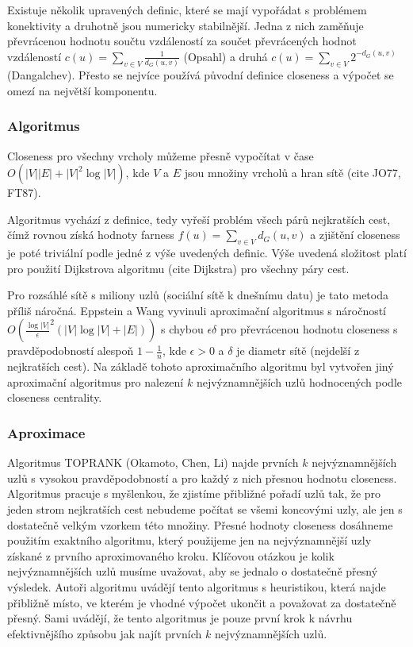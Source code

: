 \documentclass[12pt,titlepage]{report}
\begin{document}
Existuje několik upravených definic, které se mají vypořádat s problémem
konektivity a druhotně jsou numericky stabilnější. Jedna z nich zaměňuje
převrácenou hodnotu součtu vzdáleností za součet převrácených hodnot
vzdáleností $c(u) = \sum_{v \in V} \frac{1}{d_G(u, v)}$ (Opsahl) a druhá $c(u)
= \sum_{v \in V} 2^{-d_G(u, v)}$ (Dangalchev). Přesto se nejvíce používá
původní definice closeness a výpočet se omezí na největší komponentu.



\subsubsection{Algoritmus}
Closeness pro všechny vrcholy můžeme přesně vypočítat v čase $O(|V||E| +
|V|^2\log|V|)$, kde $V$ a $E$ jsou množiny vrcholů a hran sítě (cite JO77,
FT87). 

Algoritmus vychází z definice, tedy vyřeší problém všech párů nejkratších cest,
čímž rovnou získá hodnoty farness $f(u) = \sum_{v \in V} d_G(u, v)$ a zjištění
closeness je poté triviální podle jedné z výše uvedených definic.  Výše uvedená
složitost platí pro použití Dijkstrova algoritmu (cite Dijkstra) pro všechny
páry cest.

Pro rozsáhlé sítě s miliony uzlů (sociální sítě k dnešnímu datu) je tato
metoda příliš náročná. Eppstein a Wang vyvinuli aproximační algoritmus s
náročností $O(\frac{\log|V|}{\epsilon}^2 (|V| \log |V| + |E|))$ s chybou
$\epsilon \delta$ pro převrácenou hodnotu closeness s pravděpodobností alespoň
$1 - \frac{1}{n}$, kde $\epsilon > 0$ a $\delta$ je diametr sítě (nejdelší z
nejkratších cest). Na základě tohoto aproximačního algoritmu byl vytvořen jiný
aproximační algoritmus pro nalezení $k$ nejvýznamnějších uzlů hodnocených podle
closeness centrality.

\subsubsection{Aproximace}
Algoritmus TOPRANK (Okamoto, Chen, Li) najde prvních $k$ nejvýznamnějších uzlů
s vysokou pravděpodobností a pro každý z nich přesnou hodnotu closeness.
Algoritmus pracuje s myšlenkou, že zjistíme přibližné pořadí uzlů tak, že pro
jeden strom nejkratších cest nebudeme počítat se všemi koncovými uzly, ale jen
s dostatečně velkým vzorkem této množiny.  Přesné hodnoty closeness dosáhneme
použitím exaktního algoritmu, který použijeme jen na nejvýznamnější uzly
získané z prvního aproximovaného kroku. Klíčovou otázkou je kolik
nejvýznamnějších uzlů musíme uvažovat, aby se jednalo o dostatečně přesný
výsledek. Autoři algoritmu uvádějí tento algoritmus s heuristikou, která najde
přibližně místo, ve kterém je vhodné výpočet ukončit a považovat za dostatečně
přesný. Sami uvádějí, že tento algoritmus je pouze první krok k návrhu
efektivnějšího způsobu jak najít prvních $k$ nejvýznamnějších uzlů.
\end{document}
